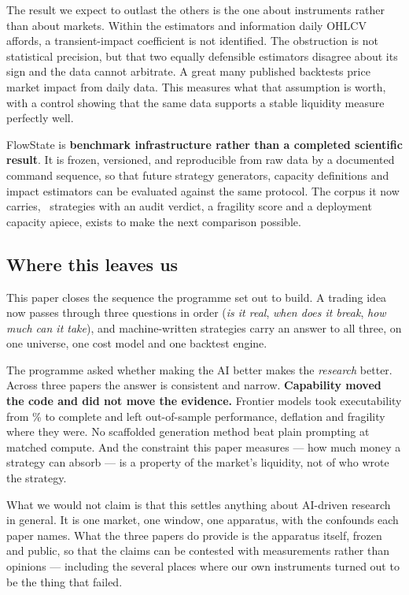\documentclass[11pt,a4paper]{article}
\begin{document}
The result we expect to outlast the others is the one about instruments rather than about markets.
Within the estimators and information daily OHLCV affords, a transient-impact coefficient is not
identified. The obstruction is not statistical precision, but that two equally defensible estimators
disagree about its sign and the data cannot arbitrate. A great many published backtests price market
impact from daily data. This measures what that assumption is worth, with a control showing that the
same data supports a stable liquidity measure perfectly well.

FlowState is \textbf{benchmark infrastructure rather than a completed scientific result}. It is
frozen, versioned, and reproducible from raw data by a documented command sequence, so that future
strategy generators, capacity definitions and impact estimators can be evaluated against the same
protocol. The corpus it now carries, \fsCorpusAllThree\ strategies with an audit verdict, a
fragility score and a deployment capacity apiece, exists to make the next comparison possible.

\subsection*{Where this leaves us}

This paper closes the sequence the programme set out to build. A trading idea now passes through
three questions in order (\emph{is it real}, \emph{when does it break}, \emph{how much can it
take}), and \fsCorpusAllThree{} machine-written strategies carry an answer to all three, on one
universe, one cost model and one backtest engine.

\begin{finding}
The programme asked whether making the AI better makes the \emph{research} better. Across three
papers the answer is consistent and narrow. \textbf{Capability moved the code and did not move the
evidence.} Frontier models took executability from \pgmLocalTrade\% to complete and left
out-of-sample performance, deflation and fragility where they were. No scaffolded generation method
beat plain prompting at matched compute. And the constraint this paper measures --- how much money a
strategy can absorb --- is a property of the market's liquidity, not of who wrote the strategy.
\end{finding}

What we would not claim is that this settles anything about AI-driven research in general. It is one
market, one window, one apparatus, with the confounds each paper names. What the three papers do
provide is the apparatus itself, frozen and public, so that the claims can be contested with
measurements rather than opinions --- including the several places where our own instruments turned
out to be the thing that failed.
\end{document}
